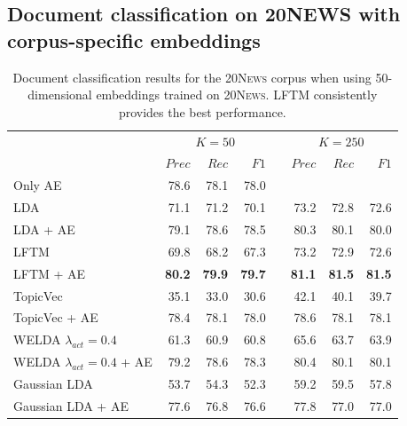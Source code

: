 \documentclass[
        a4paper,
        titlepage,
        twoside,
        parskip,
        numbers=noenddot
        ]{scrbook}
\newcommand{\ra}[1]{\renewcommand{\arraystretch}{#1}}
\theoremstyle{break}
\begin{document}
\begin{appendices}
  \subsection{Document classification on 20N{\footnotesize EWS} with corpus-specific embeddings}
  \label{sec:appendix_document_classification_corpus_specific}
  \begin{table}[H]
    \ra{1.3}
    \centering
    \caption{Document classification results for the \textsc{20News} corpus when using 50-dimensional embeddings trained on \textsc{20News}.
    LFTM consistently provides the best performance.}
    \label{table:document_classification_dim-50}
    \begin{tabular}{lrrrcrrr}
      \toprule
      \multirow{2}{*}{} & \multicolumn{3}{c}{$K = 50$} & \phantom{a} & \multicolumn{3}{c}{$K = 250$} \\ \cmidrule{2-4} \cmidrule{6-8}
                        & $Prec$    & $Rec$     & $F1$     && $Prec$    & $Rec$   & $F1$     \\ \midrule
                        Only AE                          & 78.6    & 78.1    & 78.0   && \multicolumn{3}{l}{}        \\
                        LDA                              & 71.1    & 71.2    & 70.1   && 73.2    & 72.8     & 72.6   \\
                        LDA + AE                         & 79.1    & 78.6    & 78.5   && 80.3    & 80.1     & 80.0   \\
                        LFTM                             & 69.8    & 68.2    & 67.3   && 73.2    & 72.9     & 72.6   \\
                        LFTM + AE                        & \textbf{80.2}    & \textbf{79.9}    & \textbf{79.7}   && \textbf{81.1}    & \textbf{81.5}     & \textbf{81.5}   \\
                        TopicVec                         & 35.1    & 33.0    & 30.6   && 42.1    & 40.1     & 39.7   \\
                        TopicVec + AE                    & 78.4    & 78.1    & 78.0   && 78.6    & 78.1     & 78.1   \\
                        WELDA $\lambda_{act} = 0.4$      & 61.3    & 60.9    & 60.8   && 65.6    & 63.7     & 63.9   \\ %
                        WELDA $\lambda_{act} = 0.4$ + AE & 79.2    & 78.6    & 78.3   && 80.4    & 80.1     & 80.1   \\
                        Gaussian LDA                     & 53.7    & 54.3    & 52.3   && 59.2    & 59.5     & 57.8   \\
                        Gaussian LDA + AE                & 77.6    & 76.8    & 76.6   && 77.8    & 77.0     & 77.0   \\
    \bottomrule
    \end{tabular}
  \end{table}

\end{appendices}
\end{document}
